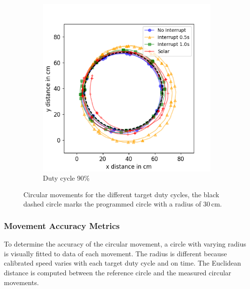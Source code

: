 \begin{figure}[h!]
	\begin{subfigure}[b]{0.49\textwidth}
		\includegraphics[width=\textwidth]{pics/circle_90.png}
		\caption{Duty cycle 90\%}
		\label{fig:circ_exp3}
	\end{subfigure}
	\caption{Circular movements for the different target duty cycles, the black dashed circle marks the programmed circle with a radius of 30\,cm.}
	\label{fig:circular_movements}
\end{figure}

\subsubsection{Movement Accuracy Metrics}

To determine the accuracy of the circular movement, a circle with varying radius is visually fitted to data of each movement.
The radius is different because calibrated speed varies with each target duty cycle and on time.
The Euclidean distance is computed between the reference circle and the measured circular movements.


